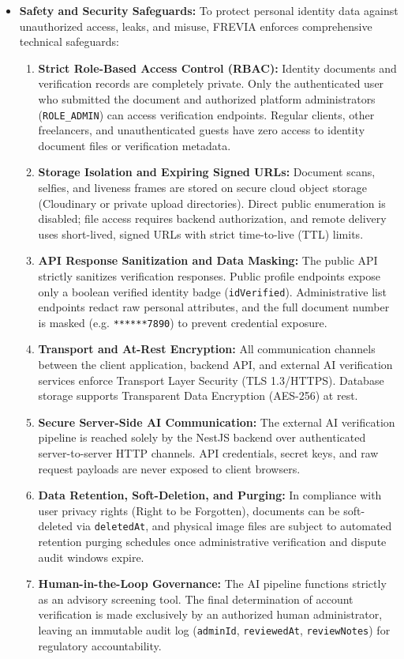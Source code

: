 \begin{itemize}
\item \textbf{Safety and Security Safeguards:} To protect personal identity data against unauthorized access, leaks, and misuse, FREVIA enforces comprehensive technical safeguards:
\begin{enumerate}
    \item \textbf{Strict Role-Based Access Control (RBAC):} Identity documents and verification records are completely private. Only the authenticated user who submitted the document and authorized platform administrators (\texttt{ROLE\_ADMIN}) can access verification endpoints. Regular clients, other freelancers, and unauthenticated guests have zero access to identity document files or verification metadata.
    \item \textbf{Storage Isolation and Expiring Signed URLs:} Document scans, selfies, and liveness frames are stored on secure cloud object storage (Cloudinary or private upload directories). Direct public enumeration is disabled; file access requires backend authorization, and remote delivery uses short-lived, signed URLs with strict time-to-live (TTL) limits.
    \item \textbf{API Response Sanitization and Data Masking:} The public API strictly sanitizes verification responses. Public profile endpoints expose only a boolean verified identity badge (\texttt{idVerified}). Administrative list endpoints redact raw personal attributes, and the full document number is masked (e.g. \texttt{******7890}) to prevent credential exposure.
    \item \textbf{Transport and At-Rest Encryption:} All communication channels between the client application, backend API, and external AI verification services enforce Transport Layer Security (TLS 1.3/HTTPS). Database storage supports Transparent Data Encryption (AES-256) at rest.
    \item \textbf{Secure Server-Side AI Communication:} The external AI verification pipeline is reached solely by the NestJS backend over authenticated server-to-server HTTP channels. API credentials, secret keys, and raw request payloads are never exposed to client browsers.
    \item \textbf{Data Retention, Soft-Deletion, and Purging:} In compliance with user privacy rights (Right to be Forgotten), documents can be soft-deleted via \texttt{deletedAt}, and physical image files are subject to automated retention purging schedules once administrative verification and dispute audit windows expire.
    \item \textbf{Human-in-the-Loop Governance:} The AI pipeline functions strictly as an advisory screening tool. The final determination of account verification is made exclusively by an authorized human administrator, leaving an immutable audit log (\texttt{adminId}, \texttt{reviewedAt}, \texttt{reviewNotes}) for regulatory accountability.
\end{enumerate}
\end{itemize}

